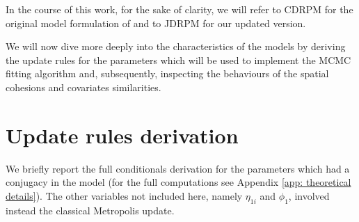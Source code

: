 \documentclass[12pt,	%
	a4paper,		%
	twoside,		%
	openright,		%
	titlepage,%
	]{book}
\theoremstyle{definition}
\begin{document}

In the course of this work, for the sake of clarity, we will refer to CDRPM for the original model formulation of \cite{1-drpm} and to JDRPM for our updated version. 

We will now dive more deeply into the characteristics of the models by deriving the update rules for the parameters which will be used to implement the MCMC fitting algorithm and, subsequently, inspecting the behaviours of the spatial cohesions and covariates similarities.

\section{Update rules derivation}
We briefly report the full conditionals derivation for the parameters which had a conjugacy in the model (for the full computations see Appendix \ref{app: theoretical details}). The other variables not included here, namely $\eta_{1i}$ and $\phi_1$, involved instead the classical Metropolis update.
\end{document}
